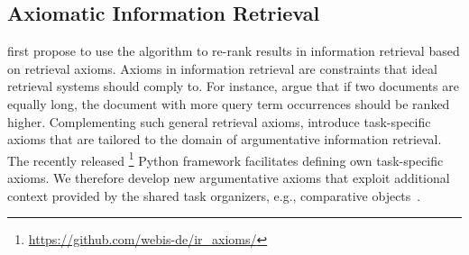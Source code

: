 \subsection{Axiomatic Information Retrieval}

\citet{HagenVGS2016} first propose to use the \KwikSort algorithm to re-rank results in information retrieval based on retrieval axioms.
Axioms in information retrieval are constraints that ideal retrieval systems should comply to.
For instance, \citet{FangTZ2004} argue that if two documents are equally long, the document with more query term occurrences should be ranked higher.
Complementing such general retrieval axioms, \citet{BondarenkoHVSPB2018} introduce task-specific axioms that are tailored to the domain of argumentative information retrieval.
The recently released \iraxioms\footnote{\url{https://github.com/webis-de/ir_axioms/}} Python framework facilitates defining own task-specific axioms.
We therefore develop new argumentative axioms that exploit additional context provided by the shared task organizers, e.g., comparative objects~\cite{BondarenkoFKSGBPBSWPH2022}.

